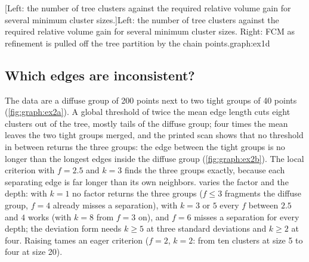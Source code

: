[Left: the number of tree clusters against the required relative volume gain for several minimum cluster sizes.]{Left: the number of tree clusters against the required relative volume gain for several minimum cluster sizes. Right: FCM as refinement is pulled off the tree partition by the chain points.}{graph:ex1d}

\subsection{Which edges are inconsistent?}

The data are a diffuse group of 200 points next to two tight groups of 40 points (\cref{fig:graph:ex2a}). A global threshold of twice the mean edge length cuts eight clusters out of the tree, mostly tails of the diffuse group; four times the mean leaves the two tight groups merged, and the printed scan shows that no threshold in between returns the three groups: the edge between the tight groups is no longer than the longest edges inside the diffuse group (\cref{fig:graph:ex2b}). The local criterion with $f=2.5$ and $k=3$ finds the three groups exactly, because each separating edge is far longer than its own neighbors.  varies the factor and the depth: with $k=1$ no factor returns the three groups ($f\le3$ fragments the diffuse group, $f=4$ already misses a separation), with $k=3$ or $5$ every $f$ between $2.5$ and $4$ works (with $k=8$ from $f=3$ on), and $f=6$ misses a separation for every depth; the deviation form needs $k\ge5$ at three standard deviations and $k\ge2$ at four. Raising  tames an eager criterion ($f=2$, $k=2$: from ten clusters at size 5 to four at size 20).

